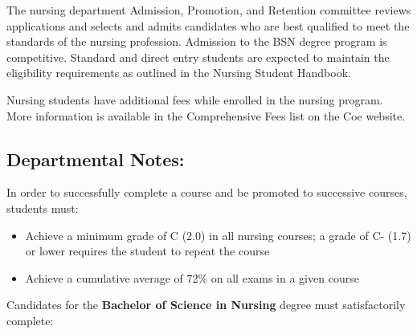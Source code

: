 \documentclass[
  letterpaper,
]{scrbook}
\providecommand{\tightlist}{%
  \setlength{\itemsep}{0pt}\setlength{\parskip}{0pt}}
\begin{document}
The nursing department Admission, Promotion, and Retention committee
reviews applications and selects and admits candidates who are best
qualified to meet the standards of the nursing profession. Admission to
the BSN degree program is competitive. Standard and direct entry
students are expected to maintain the eligibility requirements as
outlined in the Nursing Student Handbook.

Nursing students have additional fees while enrolled in the nursing
program. More information is available in the Comprehensive Fees list on
the Coe website.

\subsection{Departmental Notes:}\label{departmental-notes-1}

In order to successfully complete a course and be promoted to successive
courses, students must:

\begin{itemize}
\tightlist
\item
  Achieve a minimum grade of C (2.0) in all nursing courses; a grade of
  C- (1.7) or lower requires the student to repeat the course\\
\item
  Achieve a cumulative average of 72\% on all exams in a given course
\end{itemize}

Candidates for the \textbf{Bachelor of Science in Nursing} degree must
satisfactorily complete:
\end{document}
